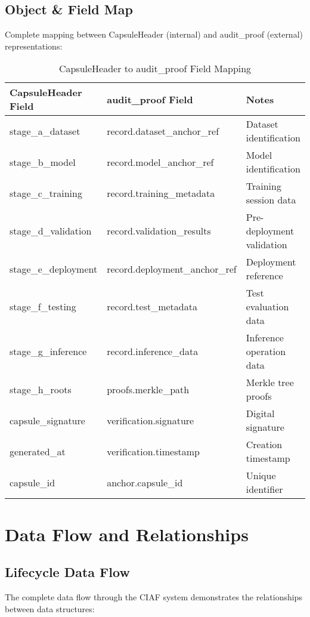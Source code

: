 \documentclass[12pt,a4paper]{article}
\begin{document}
\subsection{Object \& Field Map}

Complete mapping between CapsuleHeader (internal) and audit\_proof (external) representations:

\begin{table}[H]
\centering
\caption{CapsuleHeader to audit\_proof Field Mapping}
\begin{tabular}{|l|l|l|}
\hline
\textbf{CapsuleHeader Field} & \textbf{audit\_proof Field} & \textbf{Notes} \\
\hline
stage\_a\_dataset & record.dataset\_anchor\_ref & Dataset identification \\
stage\_b\_model & record.model\_anchor\_ref & Model identification \\
stage\_c\_training & record.training\_metadata & Training session data \\
stage\_d\_validation & record.validation\_results & Pre-deployment validation \\
stage\_e\_deployment & record.deployment\_anchor\_ref & Deployment reference \\
stage\_f\_testing & record.test\_metadata & Test evaluation data \\
stage\_g\_inference & record.inference\_data & Inference operation data \\
stage\_h\_roots & proofs.merkle\_path & Merkle tree proofs \\
capsule\_signature & verification.signature & Digital signature \\
generated\_at & verification.timestamp & Creation timestamp \\
capsule\_id & anchor.capsule\_id & Unique identifier \\
\hline
\end{tabular}
\end{table}

\section{Data Flow and Relationships}

\subsection{Lifecycle Data Flow}

The complete data flow through the CIAF system demonstrates the relationships between data structures:
\end{document}
